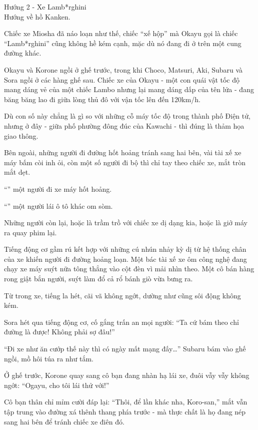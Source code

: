\documentclass[../main.tex]{subfiles}
\begin{document}
\begin{center}
    {\color{T2} Hướng 2 - Xe Lamb*rghini}\\Hướng về hồ Kanken.
\end{center}

Chiếc xe Miosha đã náo loạn như thế, chiếc ``xế hộp'' mà Okayu gọi là chiếc ``Lamb*rghini'' cũng không hề kém cạnh, mặc dù nó đang đi ở trên một cung đường khác.

Okayu và Korone ngồi ở ghế trước, trong khi Choco, Matsuri, Aki, Subaru và Sora ngồi ở các hàng ghế sau. Chiếc xe của Okayu - một con quái vật tốc độ mang dáng vẻ của một chiếc Lambo nhưng lại mang dáng dấp của tên lửa - đang băng băng lao đi giữa lòng thủ đô với vận tốc lên đến 120km/h.

Dù con số này chẳng là gì so với những cỗ máy tốc độ trong thành phố Điện tử, nhưng ở đây - giữa phố phường đông đúc của Kawachi - thì đúng là thảm họa giao thông.

Bên ngoài, những người đi đường hốt hoảng tránh sang hai bên, vài tài xế xe máy bấm còi inh ỏi, còn một số người đi bộ thì chỉ tay theo chiếc xe, mắt tròn mắt dẹt.

``'' một người đi xe máy hốt hoảng.

``'' một người lái ô tô khác om sòm.

Những người còn lại, hoặc là trầm trồ với chiếc xe dị dạng kia, hoặc là giở máy ra quay phim lại.

Tiếng động cơ gầm rú kết hợp với những cú nhún nhảy kỳ dị từ hệ thống chân của xe khiến người đi đường hoảng loạn. Một bác tài xế xe ôm công nghệ đang chạy xe máy suýt nữa tông thẳng vào cột đèn vì mải nhìn theo. Một cô bán hàng rong giật bắn người, suýt làm đổ cả rổ bánh giò vừa bưng ra.

Từ trong xe, tiếng la hét, cãi vã không ngớt, dường như cũng sôi động không kém.

Sora hét qua tiếng động cơ, cố gắng trấn an mọi người: ``Ta cứ bám theo chỉ đường là được! Không phải sợ đâu!''

``Đi xe như ăn cướp thế này thì có ngày mất mạng đấy\dots'' Subaru bám vào ghế ngồi, mồ hôi túa ra như tắm.

Ở ghế trước, Korone quay sang cô bạn đang nhàn hạ lái xe, đuôi vẫy vẫy không ngớt: ``Ogayu, cho tôi lái thử với!''

Cô bạn thân chỉ mỉm cười đáp lại: ``Thôi, để lần khác nha, Koro-san,'' mắt vẫn tập trung vào đường xá thênh thang phía trước - mà thực chất là họ đang nép sang hai bên để tránh chiếc xe điên đó.
\end{document}
